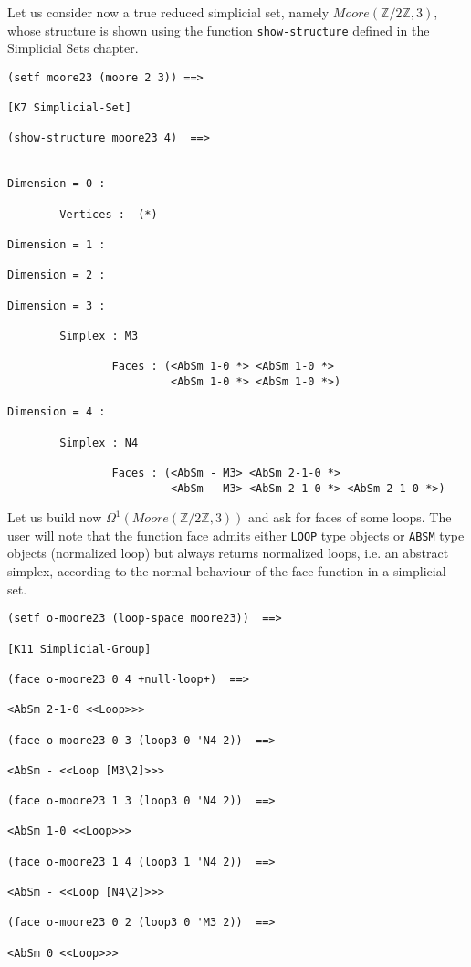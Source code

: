 Let us consider now a true reduced simplicial set, namely $Moore(\mathbb{Z}/{2\mathbb{Z}}, 3)$,
whose structure is shown using the function {\tt show-structure} defined in the Simplicial Sets chapter.
{\footnotesize\begin{verbatim}
(setf moore23 (moore 2 3)) ==>

[K7 Simplicial-Set]

(show-structure moore23 4)  ==>


Dimension = 0 :

        Vertices :  (*)

Dimension = 1 :

Dimension = 2 :

Dimension = 3 :

        Simplex : M3

                Faces : (<AbSm 1-0 *> <AbSm 1-0 *>
                         <AbSm 1-0 *> <AbSm 1-0 *>)

Dimension = 4 :

        Simplex : N4

                Faces : (<AbSm - M3> <AbSm 2-1-0 *>
                         <AbSm - M3> <AbSm 2-1-0 *> <AbSm 2-1-0 *>)
\end{verbatim}}
Let us build now $\Omega^1(Moore(\mathbb{Z}/{2\mathbb{Z}}, 3))$ and ask for faces of some loops.
The user will note that the function face admits either {\tt LOOP} type objects or
{\tt ABSM} type objects (normalized loop) but always returns normalized loops, i.e.
an abstract simplex, according to the normal behaviour of the face function in a
simplicial set.
{\footnotesize\begin{verbatim}
(setf o-moore23 (loop-space moore23))  ==>

[K11 Simplicial-Group]

(face o-moore23 0 4 +null-loop+)  ==>

<AbSm 2-1-0 <<Loop>>>

(face o-moore23 0 3 (loop3 0 'N4 2))  ==>

<AbSm - <<Loop [M3\2]>>>

(face o-moore23 1 3 (loop3 0 'N4 2))  ==>

<AbSm 1-0 <<Loop>>>

(face o-moore23 1 4 (loop3 1 'N4 2))  ==>

<AbSm - <<Loop [N4\2]>>>

(face o-moore23 0 2 (loop3 0 'M3 2))  ==>

<AbSm 0 <<Loop>>>
\end{verbatim}}
\newpage
